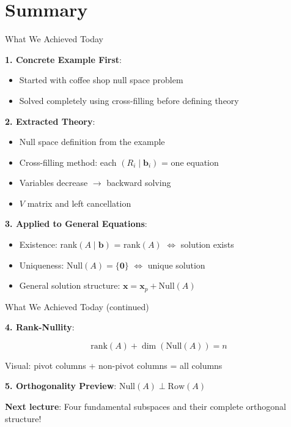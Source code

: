\documentclass[10pt]{beamer}
\theoremstyle{definition}
\newcommand{\x}[1]{\alert{\textbf{#1}}}
\begin{document}
\section{Summary}

\begin{frame}{What We Achieved Today}

\x{1. Concrete Example First}:
\begin{itemize}
\item Started with coffee shop null space problem
\item Solved completely using cross-filling before defining theory
\end{itemize}

\vspace{0.5em}

\x{2. Extracted Theory}:
\begin{itemize}
\item Null space definition from the example
\item Cross-filling method: each $(R_i \mid \mathbf{b}_i)$ = one equation
\item Variables decrease $\to$ backward solving
\item $V$ matrix and left cancellation
\end{itemize}

\vspace{0.5em}

\x{3. Applied to General Equations}:
\begin{itemize}
\item Existence: rank$(A \mid \mathbf{b})$ = rank$(A)$ $\iff$ solution exists
\item Uniqueness: $\text{Null}(A) = \{\mathbf{0}\}$ $\iff$ unique solution
\item General solution structure: $\mathbf{x} = \mathbf{x}_p + \text{Null}(A)$
\end{itemize}

\end{frame}

\begin{frame}{What We Achieved Today (continued)}

\x{4. Rank-Nullity}:

$$\text{rank}(A) + \dim(\text{Null}(A)) = n$$

Visual: pivot columns + non-pivot columns = all columns

\vspace{1em}

\x{5. Orthogonality Preview}: $\text{Null}(A) \perp \text{Row}(A)$

\vspace{1em}

\x{Next lecture}: Four fundamental subspaces and their complete orthogonal structure!

\end{frame}
\end{document}
